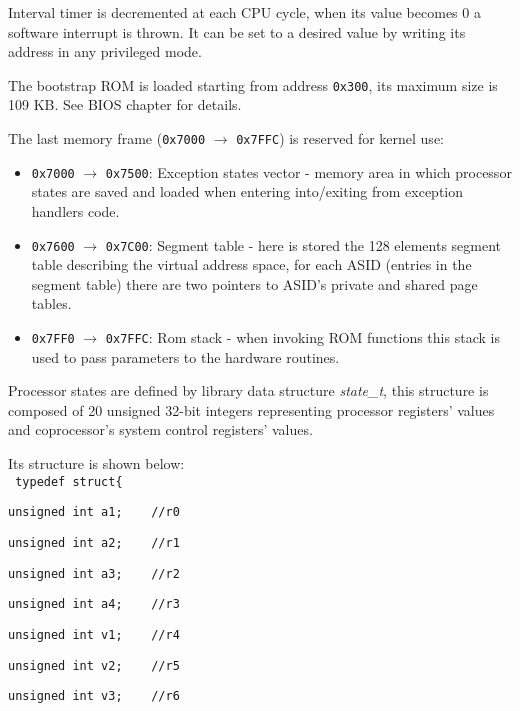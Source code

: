 
Interval timer is decremented at each CPU cycle, when its value becomes 0 a software interrupt is thrown. It can be set to a desired value by writing its address in any privileged mode.

The bootstrap ROM is loaded starting from address \texttt{0x300}, its maximum size is 109 KB.
See BIOS chapter for details.

\label{sec:man:kernelReservedFrame}
The last memory frame (\texttt{0x7000} $\rightarrow$ \texttt{0x7FFC}) is reserved for kernel use:
\begin{itemize}
\item \texttt{0x7000} $\rightarrow$ \texttt{0x7500}: Exception states vector - memory area in which processor states are saved and loaded when entering into/exiting from exception handlers code.
\item \texttt{0x7600} $\rightarrow$ \texttt{0x7C00}: Segment table - here is stored the 128 elements segment table describing the virtual address space, for each ASID (entries in the segment table) there are two pointers to ASID's private and shared page tables.
\item \texttt{0x7FF0} $\rightarrow$ \texttt{0x7FFC}: Rom stack - when invoking ROM functions this stack is used to pass parameters to the hardware routines.
\end{itemize}

Processor states are defined by library data structure \emph{state\_t}, this structure is composed of 20 unsigned 32-bit integers representing processor registers' values and coprocessor's system control registers' values. 

Its structure is shown below:
\nopagebreak
\\
\texttt{ typedef struct\{}

\nopagebreak
\texttt{unsigned int a1;\ \ \ \ //r0}

\nopagebreak
\texttt{unsigned int a2;\ \ \ \ //r1}

\nopagebreak
\texttt{unsigned int a3;\ \ \ \ //r2}

\nopagebreak
\texttt{unsigned int a4;\ \ \ \ //r3}

\nopagebreak
\texttt{unsigned int v1;\ \ \ \ //r4}

\nopagebreak
\texttt{unsigned int v2;\ \ \ \ //r5}

\nopagebreak
\texttt{unsigned int v3;\ \ \ \ //r6}

